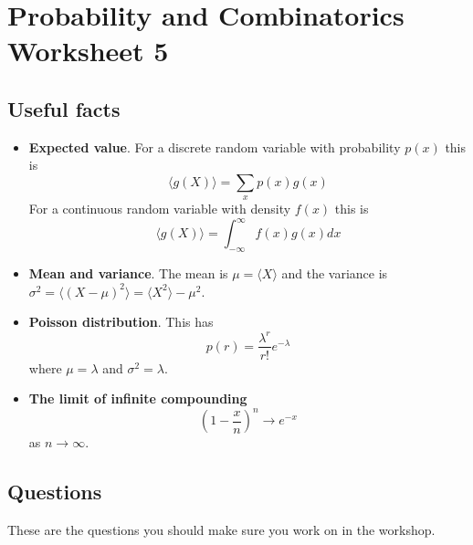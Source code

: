 \documentclass[11pt,a4paper]{scrartcl}
\begin{document}
\section*{Probability and Combinatorics Worksheet 5}

\subsection*{Useful facts}

\begin{itemize}

\item \textbf{Expected value}. For a discrete random variable with probability $p(x)$ this is
\begin{equation}
\langle g(X) \rangle = \sum_x p(x)g(x)
\end{equation}
For a continuous random variable with density $f(x)$ this is
\begin{equation}
\langle g(X)\rangle = \int_{-\infty}^\infty{f(x)g(x)}dx
\end{equation}


\item \textbf{Mean and variance}. The mean is $\mu=\langle X\rangle$ and the variance is $\sigma^2=\langle(X-\mu)^2\rangle=\langle X^2\rangle - \mu^2$.

\item \textbf{Poisson distribution}. This has
\begin{equation}
p(r)=\frac{\lambda^r}{r!}e^{-\lambda}
\end{equation}
where $\mu=\lambda$ and $\sigma^2=\lambda$.

\item \textbf{The limit of infinite compounding}
  \begin{equation}
    \left(1-\frac{x}{n}\right)^n\rightarrow e^{-x}
  \end{equation}
  as $n\rightarrow\infty$.

  
\end{itemize}



\subsection*{Questions}

These are the questions you should make sure you work on in the workshop.
\end{document}
